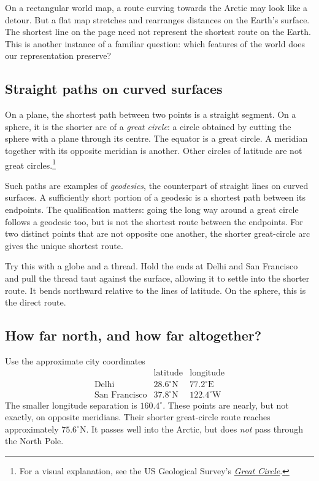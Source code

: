 On a rectangular world map, a route curving towards the Arctic may look like
a detour. But a flat map stretches and rearranges distances on the Earth's
surface. The shortest line on the page need not represent the shortest route
on the Earth. This is another instance of a familiar question: which features
of the world does our representation preserve?

\subsection{Straight paths on curved surfaces}

On a plane, the shortest path between two points is a straight segment.
On a sphere, it is the shorter arc of a \emph{great circle}: a circle obtained
by cutting the sphere with a plane through its centre. The equator is a great
circle. A meridian together with its opposite meridian is another. Other
circles of latitude are not great circles.\footnote{For a visual explanation,
see the US Geological Survey's \href{https://www.usgs.gov/media/videos/great-circle}
{\emph{Great Circle}}.}

Such paths are examples of \emph{geodesics}, the counterpart of straight
lines on curved surfaces. A sufficiently short portion of a geodesic is a
shortest path between its endpoints. The qualification matters: going the
long way around a great circle follows a geodesic too, but is not the shortest
route between the endpoints. For two distinct points that are not opposite
one another, the shorter great-circle arc gives the unique shortest route.

Try this with a globe and a thread. Hold the ends at Delhi and San Francisco
and pull the thread taut against the surface, allowing it to settle into the
shorter route. It bends northward relative to the lines of latitude. On the
sphere, this is the direct route.

\subsection{How far north, and how far altogether?}

Use the approximate city coordinates
\[
\begin{array}{c|cc}
&\text{latitude}&\text{longitude}\\\hline
\text{Delhi}&28.6^\circ\mathrm{N}&77.2^\circ\mathrm{E}\\
\text{San Francisco}&37.8^\circ\mathrm{N}&122.4^\circ\mathrm{W}
\end{array}
\]
The smaller longitude separation is $160.4^\circ$. These points are nearly,
but not exactly, on opposite meridians. Their shorter great-circle route
reaches approximately $75.6^\circ\mathrm{N}$. It passes well into the Arctic,
but does \emph{not} pass through the North Pole.


